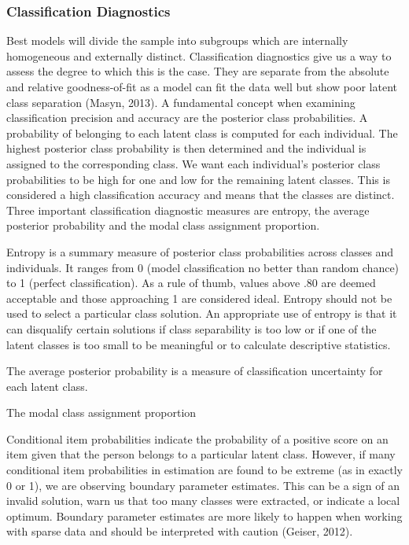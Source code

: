 \documentclass[
  ,man]{apa6}
\begin{document}
\hypertarget{classification-diagnostics}{%
\subsubsection{Classification Diagnostics}\label{classification-diagnostics}}

Best models will divide the sample into subgroups which are internally homogeneous and externally distinct.
Classification diagnostics give us a way to assess the degree to which this is the case.
They are separate from the absolute and relative goodness-of-fit
as a model can fit the data well but show poor latent class separation (Masyn, 2013).
A fundamental concept when examining classification precision and accuracy are the posterior class probabilities.
A probability of belonging to each latent class is computed for each individual.
The highest posterior class probability is then determined and the individual is assigned to the corresponding class.
We want each individual's posterior class probabilities to be high for one and low for the remaining latent classes.
This is considered a high classification accuracy and means that the classes are distinct.
Three important classification diagnostic measures are entropy, the average posterior probability and the modal class assignment proportion.

Entropy is a summary measure of posterior class probabilities across classes and individuals.
It ranges from 0 (model classification no better than random chance) to 1 (perfect classification).
As a rule of thumb, values above .80 are deemed acceptable and those approaching 1 are considered ideal.
Entropy should not be used to select a particular class solution.
An appropriate use of entropy is that it can disqualify certain solutions if class separability is too low
or if one of the latent classes is too small to be meaningful or to calculate descriptive statistics.

The average posterior probability is a measure of classification uncertainty for each latent class.

The modal class assignment proportion

Conditional item probabilities indicate the probability of a positive score on an item
given that the person belongs to a particular latent class.
However, if many conditional item probabilities in estimation are found to be extreme (as in exactly 0 or 1),
we are observing boundary parameter estimates. This can be a sign of an invalid solution,
warn us that too many classes were extracted, or indicate a local optimum.
Boundary parameter estimates are more likely to happen when working with sparse data
and should be interpreted with caution (Geiser, 2012).
\end{document}
